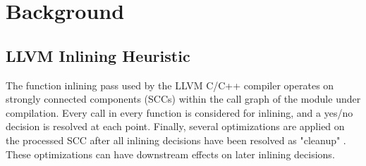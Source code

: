 \documentclass[nohyperref]{article}
\theoremstyle{plain}
\theoremstyle{definition}
\theoremstyle{remark}
\begin{document}




\section{Background}
\label{background}
\subsection{LLVM Inlining Heuristic}
The function inlining pass used by the LLVM C/C++ compiler operates on strongly connected components (SCCs) within the call graph of the module under compilation. Every call in every function is considered for inlining, and a yes/no decision is resolved at each point. Finally, several optimizations are applied on the processed SCC after all inlining decisions have been resolved as "cleanup" \cite{mlgo}. These optimizations can have downstream effects on later inlining decisions.
\end{document}
